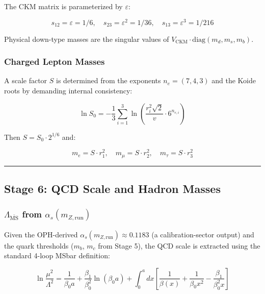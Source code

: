 The CKM matrix is parameterized by \(\varepsilon\):

\[s_{12} = \varepsilon = 1/6, \quad s_{23} = \varepsilon^2 = 1/36, \quad s_{13} = \varepsilon^3 = 1/216\]

Physical down-type masses are the singular values of \(V_{\text{CKM}} \cdot \text{diag}(m_d, m_s, m_b)\).

\subsubsection{Charged Lepton Masses}\label{66-charged-lepton-masses}

A scale factor \(S\) is determined from the exponents \(n_e = (7, 4, 3)\) and the Koide roots by demanding internal consistency:

\[\ln S_0 = -\frac{1}{3}\sum_{i=1}^3 \ln\left(\frac{r_i^2 \sqrt{2}}{v} \cdot 6^{n_{e,i}}\right)\]

Then \(S = S_0 \cdot 2^{1/6}\) and:

\[m_e = S \cdot r_1^2, \quad m_\mu = S \cdot r_2^2, \quad m_\tau = S \cdot r_3^2\]

\begin{center}\rule{0.5\linewidth}{0.5pt}\end{center}

\subsection{Stage 6: QCD Scale and Hadron Masses}\label{7-stage-6-qcd-scale-and-hadron-masses}

\subsubsection{\texorpdfstring{\(\Lambda_{\overline{\text{MS}}}\) from \(\alpha_s(m_{Z,\text{run}})\)}{7.1 \textbackslash Lambda\_\{\textbackslash overline\{\textbackslash text\{MS\}\}\} from \textbackslash alpha\_s(m\_\{Z,run\})}}\label{71-lambda_overlinetextms-from-alpha_sm_zrun}

Given the OPH-derived \(\alpha_s(m_{Z,\text{run}}) \approx 0.1183\) (a calibration-sector output) and the quark thresholds (\(m_b\), \(m_c\) from Stage 5), the QCD scale is extracted using the standard 4-loop MSbar definition:

\[\ln\frac{\mu^2}{\Lambda^2} = \frac{1}{\beta_0 a} + \frac{\beta_1}{\beta_0^2}\ln(\beta_0 a) + \int_0^a dx\left[\frac{1}{\beta(x)} + \frac{1}{\beta_0 x^2} - \frac{\beta_1}{\beta_0^2 x}\right]\]

